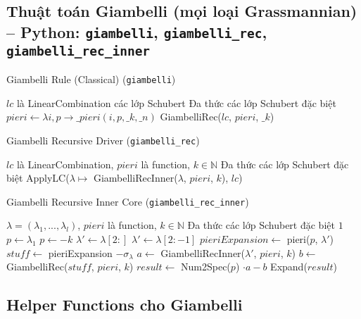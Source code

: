 
\subsection*{Thuật toán Giambelli (mọi loại Grassmannian) -- Python: \texttt{giambelli}, \texttt{giambelli\_rec}, \texttt{giambelli\_rec\_inner}}

\begin{algorithm}[H]
\caption{Giambelli Rule (Classical) (\texttt{giambelli})}
\begin{algorithmic}[1]
\REQUIRE $lc$ là LinearCombination các lớp Schubert
\ENSURE Đa thức các lớp Schubert đặc biệt
\STATE $pieri \gets \lambda i, p \to \_pieri(i, p, \_k, \_n)$
\RETURN GiambelliRec($lc$, $pieri$, $\_k$)
\end{algorithmic}
\end{algorithm}

\begin{algorithm}[H]
\caption{Giambelli Recursive Driver (\texttt{giambelli\_rec})}
\begin{algorithmic}[1]
\REQUIRE $lc$ là LinearCombination, $pieri$ là function, $k \in \mathbb{N}$
\ENSURE Đa thức các lớp Schubert đặc biệt
\RETURN ApplyLC($\lambda \mapsto$ GiambelliRecInner($\lambda$, $pieri$, $k$), $lc$)
\end{algorithmic}
\end{algorithm}

\begin{algorithm}[H]
\caption{Giambelli Recursive Inner Core (\texttt{giambelli\_rec\_inner})}
\begin{algorithmic}[1]
\REQUIRE $\lambda = (\lambda_1, ..., \lambda_l)$, $pieri$ là function, $k \in \mathbb{N}$
\ENSURE Đa thức các lớp Schubert đặc biệt
    \RETURN $1$
\ENDIF
\STATE $p \gets \lambda_1$
    \STATE $p \gets -k$
\ENDIF
\STATE $\lambda' \gets \lambda[2:]$
    \STATE $\lambda' \gets \lambda[2:-1]$
\ENDIF
\STATE $pieriExpansion \gets$ pieri($p$, $\lambda'$)
\STATE $stuff \gets$ pieriExpansion $- \sigma_\lambda$
\STATE $a \gets$ GiambelliRecInner($\lambda'$, $pieri$, $k$)
\STATE $b \gets$ GiambelliRec($stuff$, $pieri$, $k$)
\STATE $result \gets$ Num2Spec($p$) $\cdot a - b$
\RETURN Expand($result$)
\end{algorithmic}
\end{algorithm}

\subsection*{Helper Functions cho Giambelli}

